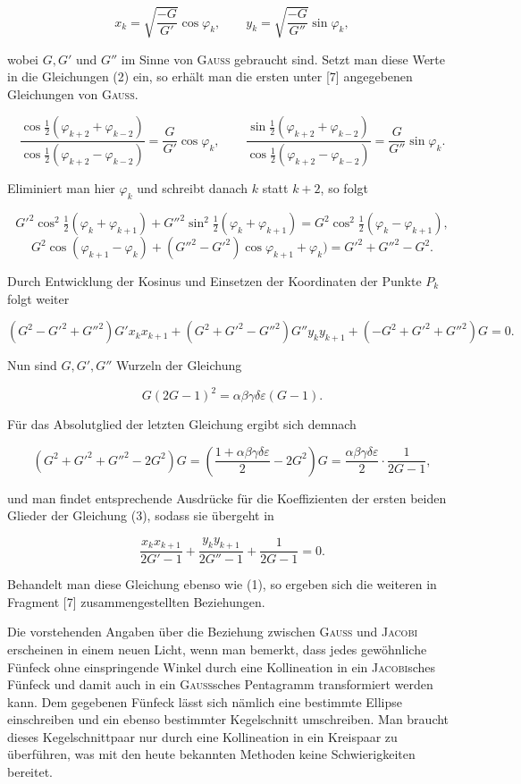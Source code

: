 \[
x_k = \sqrt{\dfrac{-G}{G'}}\cos\varphi_k, \qquad y_k = \sqrt{\dfrac{-G}{G''}}\sin\varphi_k,
\]

wobei $G, G'$ und $G''$ im Sinne von \textsc{Gauss} gebraucht sind. Setzt man diese Werte in die
Gleichungen (2) ein, so erhält man die ersten unter [7] angegebenen Gleichungen von \textsc{Gauss}.

\[
\dfrac{\cos\frac{1}{2}(\varphi_{k+2}+\varphi_{k-2})}{\cos\frac{1}{2}(\varphi_{k+2}-\varphi_{k-2})}
= \dfrac{G}{G'}\cos\varphi_k, \qquad
\dfrac{\sin\frac{1}{2}(\varphi_{k+2}+\varphi_{k-2})}{\cos\frac{1}{2}(\varphi_{k+2}-\varphi_{k-2})}
= \dfrac{G}{G''}\sin\varphi_k.
\]

Eliminiert man hier $\varphi_k$ und schreibt danach $k$ statt $k+2$, so folgt

\[
G'^2\cos^2\tfrac{1}{2}(\varphi_k+\varphi_{k+1}) + G''^2\sin^2\tfrac{1}{2}(\varphi_k+\varphi_{k+1})
= G^2\cos^2\tfrac{1}{2}(\varphi_k-\varphi_{k+1}),
\]
\[
G^2\cos(\varphi_{k+1}-\varphi_k) + (G''^2-G'^2)\cos\varphi_{k+1}+\varphi_k) = G'^2+G''^2-G^2.
\]

Durch Entwicklung der Kosinus und Einsetzen der Koordinaten der Punkte $P_k$ folgt weiter

\[
(G^2-G'^2+G''^2)G'x_kx_{k+1} + (G^2+G'^2-G''^2)G''y_ky_{k+1} +
(-G^2+G'^2+G''^2)G = 0.\tag{3}
\]

Nun sind $G, G', G''$ Wurzeln der Gleichung

\[
G(2G-1)^2 = \alpha\beta\gamma\delta\varepsilon(G-1).
\]

Für das Absolutglied der letzten Gleichung ergibt sich demnach

\[
(G^2+G'^2+G''^2-2G^2)G = \left(\dfrac{1+\alpha\beta\gamma\delta\varepsilon}{2} - 2G^2\right)G
= \dfrac{\alpha\beta\gamma\delta\varepsilon}{2}\cdot\dfrac{1}{2G-1},
\]

und man findet entsprechende Ausdrücke für die Koeffizienten der ersten beiden Glieder der
Gleichung (3), sodass sie übergeht in

\[
\dfrac{x_kx_{k+1}}{2G'-1} + \dfrac{y_ky_{k+1}}{2G''-1} + \dfrac{1}{2G-1} = 0.\tag{4}
\]

Behandelt man diese Gleichung ebenso wie (1), so ergeben sich die weiteren in Fragment
[7] zusammengestellten Beziehungen.

Die vorstehenden Angaben über die Beziehung zwischen \textsc{Gauss} und \textsc{Jacobi} erscheinen in einem neuen
Licht, wenn man bemerkt, dass jedes gewöhnliche Fünfeck ohne
einspringende Winkel durch eine Kollineation in ein \textsc{Jacobi}sches Fünfeck und damit auch in ein \textsc{Gauss}sches
Pentagramm transformiert werden kann. Dem gegebenen Fünfeck lässt sich nämlich eine
bestimmte Ellipse einschreiben und ein ebenso bestimmter Kegelschnitt umschreiben.
Man braucht dieses Kegelschnittpaar nur durch eine Kollineation in ein Kreispaar zu überführen,
was mit den heute bekannten Methoden keine Schwierigkeiten bereitet.

